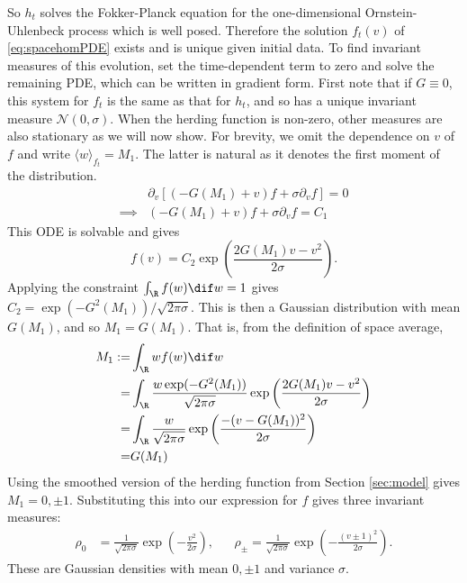       So $h_t$ solves the Fokker-Planck equation for the one-dimensional Ornstein-Uhlenbeck process which is well posed. Therefore the solution $f_t(v)$ of \eqref{eq:spacehomPDE} exists and is unique given initial data. To find invariant measures of this evolution, set the time-dependent term to zero and solve the remaining PDE, which can be written in gradient form. First note that if $G\equiv 0$, this system for $f_t$ is the same as that for $h_t$, and so has a unique invariant measure $\mathcal{N}(0,\sigma)$. When the herding function is non-zero, other measures are also stationary as we will now show. For brevity, we omit the dependence on $v$ of $f$ and write $\langle w \rangle_{f_t} = M_1$. The latter is natural as it denotes the first moment of the distribution.
      \begin{align*}
      &\partial_v\left[(-G(M_1) +v) f + \sigma \partial_v f \right] = 0\\
      \implies& (-G(M_1) +v) f + \sigma \partial_v f = C_1
      \end{align*}
      This ODE is solvable and gives 
      \[
      f(v) = C_2\exp\left(\frac{2G(M_1)v - v^2}{2\sigma} \right). 
      \]
      Applying the constraint $\int_\R f(w)\dif w = 1$ gives $C_2 = \exp(-G^2(M_1))/\sqrt{2\pi\sigma}$. This is then a Gaussian distribution with mean $G(M_1)$, and so $M_1 = G(M_1)$. That is, from the definition of space average,
      \begin{align*}
      M_1 :=& \int_\R wf(w) \dif w\\ 
      =& \int_\R \frac{w\exp(-G^2(M_1))}{\sqrt{2\pi\sigma}} \exp\left(\frac{2G(M_1)v - v^2}{2\sigma} \right)\\ 
      =& \int_\R \frac{w}{\sqrt{2\pi\sigma}} \exp\left(\frac{ - (v-G(M_1))^2}{2\sigma} \right)\\
      =& G(M_1)
      \end{align*}
      Using the smoothed version of the herding function from Section \ref{sec:model} gives $M_1 = 0, \pm 1$. Substituting this into our expression for $f$ gives three invariant measures:
      \begin{align*}
      \rho_0 &= \frac{1}{\sqrt{2\pi\sigma}}\exp\left(-\frac{v^2}{2\sigma} \right), && \rho_{\pm} = \frac{1}{\sqrt{2\pi\sigma}}\exp\left(-\frac{(v\pm 1)^2}{2\sigma}\right).
      \end{align*}
      These are Gaussian densities with mean $0, \pm 1$ and variance $\sigma$.
      

